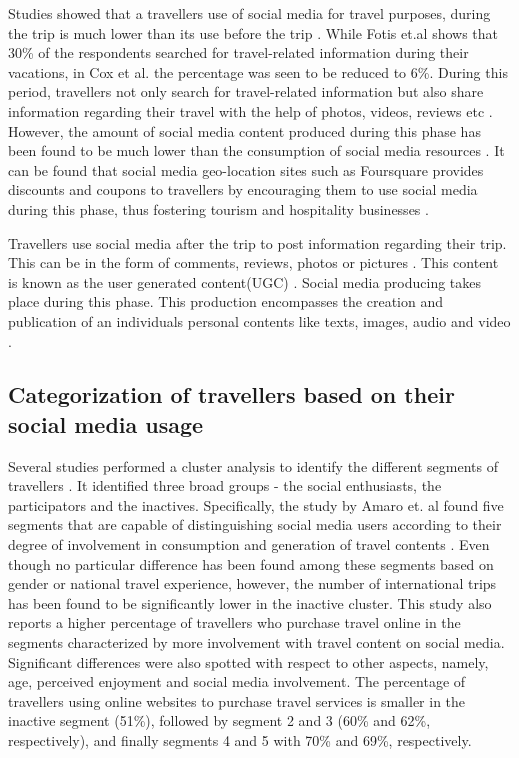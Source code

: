 Studies showed that a traveller\textquotesingle s use of social media for travel purposes, during the trip is much lower than its use before the trip \cite{cox2009role}\cite{fotis2012social}. While Fotis et.al shows that 30\% of the respondents searched for travel-related information during their vacations, in Cox et al. the percentage was seen to be reduced to 6\%\cite{fotis2012social}\cite{cox2009role}. During this period, travellers not only search for travel-related information but also share information regarding their travel with the help of photos, videos, reviews etc \cite{amaro2016travelers}. However, the amount of social media content produced during this phase has been found to be much lower than the consumption of social media resources \cite{fotis2012social}. It can be found that social media geo-location sites such as Foursquare provides discounts and coupons to travellers by encouraging them to use social media during this phase, thus fostering tourism and hospitality businesses \cite{hudson2013impact}.

Travellers use social media after the trip to post information regarding their trip. This can be in the form of comments, reviews, photos or pictures \cite{fotis2012social}\cite{parra2012travellers}. This content is known as the user generated content(UGC) \cite{simms2012online}. Social media producing takes place during this phase. This production encompasses the creation and publication of an individual\textquotesingle s personal contents like texts, images, audio and video \cite{shao2009understanding}. 


\subsection{Categorization of travellers based on their social media usage}\label{2.3}

Several studies performed a cluster analysis to identify the different segments of travellers\cite{chiu2012china}\cite{foster2011exploring}\cite{kurtulucs2015social} . It identified three broad groups - the social enthusiasts, the participators and the inactives. Specifically, the study by Amaro et. al found five segments that are capable of distinguishing social media users according to their degree of involvement in consumption and generation of travel contents \cite{amaro2016travelers}. Even though no particular difference has been found among these segments based on gender or national travel experience, however, the number of international trips has been found to be significantly lower in the inactive cluster. This study also reports a higher percentage of travellers who purchase travel online in the segments characterized by more involvement with travel content on social media. Significant differences were also spotted with respect to other aspects, namely, age, perceived enjoyment and social media involvement. 	The percentage of travellers using online websites to purchase travel services is smaller in the inactive segment (51\%), followed by segment 2 and 3 (60\% and 62\%, respectively), and finally segments 4 and 5 with 70\% and 69\%, respectively.


